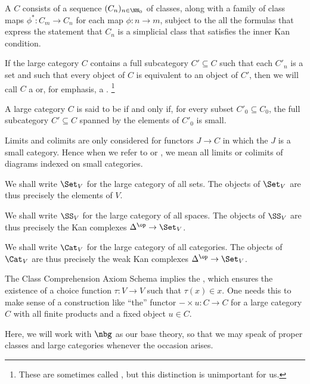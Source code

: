 \begin{definition}
	A  $C$ consists of a sequence $(C_n)_{n\in\NN_0}$ of classes,
	along with a family of class maps $ \phi^{\ast} \colon C_m \to C_n $ for each map $ \phi \colon n \to m $,
	subject to the all the formulas that express the statement that $C_n$ is a simplicial class
	that satisfies the inner Kan condition.

	If the large category $C$ contains a full subcategory $ C' \subseteq C $
	such that each $ C'_n $ is a set and such that every object of $ C $ is equivalent to an object of $ C' $,
	then we will call $ C $ a 
	or, for emphasis, a .%
	\footnote{These are sometimes called ,
	but this distinction is unimportant for us.}
	
	A large category $ C $ is said to be  if and only if,
	for every subset $ C'_0 \subseteq C_0$,
	the full subcategory $ C' \subseteq C $ spanned by the elements of $ C'_0 $ is small.
	
	Limits and colimits are only considered for functors $ J \to C $ in which
	the $ J $ is a small category.
	Hence when we refer to  or ,
	we mean all limits or colimits of diagrams indexed on small categories.
\end{definition}

\begin{eg}
	We shall write $ \Set_V $ for the large category of all sets.
	The objects of $ \Set_V$ are thus precisely the elements of $V$.

	We shall write $ \SS_V $ for the large category of all spaces.
	The objects of $ \SS_V $ are thus precisely the Kan complexes $ \Delta^{\op} \to \Set_V $.

	We shall write $ \Cat_V $ for the large category of all categories.
	The objects of $ \Cat_V $ are thus precisely the weak Kan complexes $ \Delta^{\op} \to \Set_V $.
\end{eg}

The Class Comprehension Axiom Schema implies the ,
which ensures the existence of a choice function $ \tau \colon V \to V $ such that $ \tau(x) \in x $.
One needs this to make sense of a construction
like \enquote{the} functor $ - \times u \colon C \to C $ for a large category $ C $
with all finite products and a fixed object $ u \in C $.

Here, we will work with $\nbg$ as our base theory,
so that we may speak of proper classes and large categories
whenever the occasion arises.

